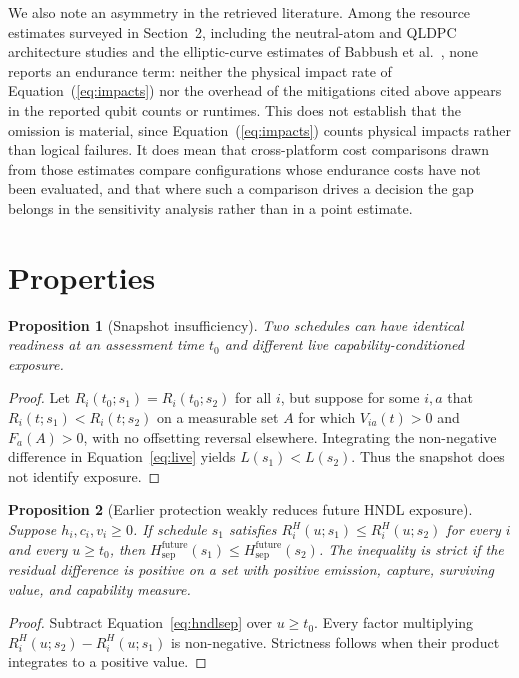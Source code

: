 \documentclass[10pt]{article}
\newtheorem{proposition}{Proposition}
\begin{document}
We also note an asymmetry in the retrieved literature. Among the resource estimates surveyed in Section~2, including the neutral-atom and QLDPC architecture studies \cite{cain2026,pinnacle2026} and the elliptic-curve estimates of Babbush et al.\ \cite{babbush2026}, none reports an endurance term: neither the physical impact rate of Equation~(\ref{eq:impacts}) nor the overhead of the mitigations cited above appears in the reported qubit counts or runtimes. This does not establish that the omission is material, since Equation~(\ref{eq:impacts}) counts physical impacts rather than logical failures. It does mean that cross-platform cost comparisons drawn from those estimates compare configurations whose endurance costs have not been evaluated, and that where such a comparison drives a decision the gap belongs in the sensitivity analysis rather than in a point estimate.

\section{Properties}

\begin{proposition}[Snapshot insufficiency]
Two schedules can have identical readiness at an assessment time $t_0$ and different live capability-conditioned exposure.
\end{proposition}
\begin{proof}
Let $R_i(t_0;s_1)=R_i(t_0;s_2)$ for all $i$, but suppose for some $i,a$ that $R_i(t;s_1)<R_i(t;s_2)$ on a measurable set $A$ for which $V_{ia}(t)>0$ and $F_a(A)>0$, with no offsetting reversal elsewhere. Integrating the non-negative difference in Equation~\eqref{eq:live} yields $L(s_1)<L(s_2)$. Thus the snapshot does not identify exposure.
\end{proof}

\begin{proposition}[Earlier protection weakly reduces future HNDL exposure]
Suppose $h_i,c_i,v_i\ge0$. If schedule $s_1$ satisfies $R_i^H(u;s_1)\le R_i^H(u;s_2)$ for every $i$ and every $u\ge t_0$, then $H_{\mathrm{sep}}^{\mathrm{future}}(s_1)\le H_{\mathrm{sep}}^{\mathrm{future}}(s_2)$. The inequality is strict if the residual difference is positive on a set with positive emission, capture, surviving value, and capability measure.
\end{proposition}
\begin{proof}
Subtract Equation~\eqref{eq:hndlsep} over $u\ge t_0$. Every factor multiplying $R_i^H(u;s_2)-R_i^H(u;s_1)$ is non-negative. Strictness follows when their product integrates to a positive value.
\end{proof}
\end{document}
